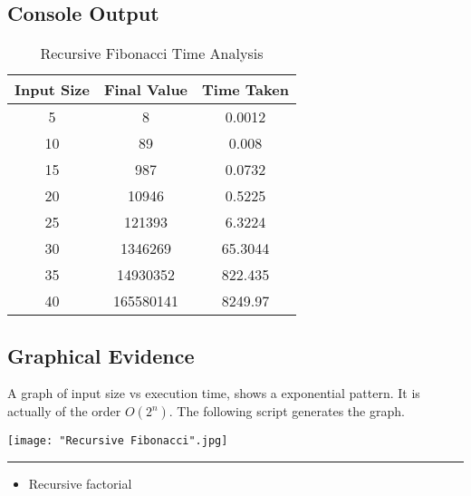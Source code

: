 \documentclass[a4paper, 12pt]{article}
\begin{document}
\subsection*{Console Output}
\begin{table}[H]
	\begin{center}
		\begin{tabular}{|c|c|c|}
		\hline
			Input Size  &    Final Value  &   Time Taken\\\hline
    5       &            8   &     0.0012\\
   10       &           89   &      0.008\\
   15        &         987   &     0.0732\\
   20       &        10946   &     0.5225\\
   25       &       121393   &     6.3224\\
   30       &      1346269   &    65.3044\\
   35        &    14930352   &    822.435\\
   40        &   165580141   &    8249.97\\\hline
		\end{tabular}\caption{Recursive Fibonacci Time Analysis}\label{Table 3}
	\end{center}
\end{table}

\subsection*{Graphical Evidence}
\begin{flushleft}
A graph of input size vs execution time, shows a exponential pattern. It is actually of the order $O(2^n)$. The following script generates the graph.
\end{flushleft}

\begin{center}
		\texttt{[image: "Recursive Fibonacci".jpg]}
	\end{center}
	
	\noindent\rule{\textwidth}{1pt}
	\begin{itemize}
		\item Recursive factorial
	\end{itemize}
	
	\pagebreak
\end{document}
